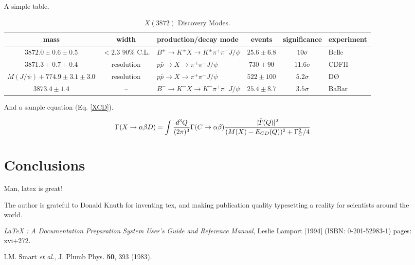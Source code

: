 \documentclass[aps,floatfix,prd,showpacs]{revtex4}
\begin{document}
A simple table.

\begin{table}[ht]
\caption{$X(3872)$ Discovery Modes.}
\label{XmodesTab}
\begin{tabular}{cclccl}
\hline
mass & width & production/decay mode & events & significance & experiment\\
\hline
\hline
$3872.0 \pm 0.6 \pm 0.5$  & $< 2.3$ 90\% C.L.  & $B^\pm \to K^\pm X \to K^\pm \pi^+ \pi^- J/\psi$   &  $25.6 \pm 6.8$ & $10 \sigma$     & Belle\\
$3871.3 \pm 0.7 \pm 0.4$  & resolution & $p\bar p \to  X \to \pi^+ \pi^- J/\psi$   &  $730 \pm 90$ & $11.6 \sigma$  & CDFII\\
$M(J/\psi) + 774.9 \pm 3.1 \pm 3.0$ & resolution & $p\bar p \to X \to \pi^+\pi^-J/\psi$ & $522 \pm 100$ & $5.2 \sigma$  & D{\O} \\
$3873.4 \pm 1.4$  &  --  & $B^- \to K^- X \to K^- \pi^+ \pi^- J/\psi$   &  $25.4 \pm 8.7$ &$3.5 \sigma$ & BaBar\\
\hline
\hline
\end{tabular}
\end{table}

And a sample equation (Eq. \ref{XCD}).

\begin{equation}
\Gamma(X \to \alpha\beta D) = \int {d^3Q\over (2\pi)^3}  \Gamma(C\to \alpha\beta) {|\tilde T(Q)|^2 \over
(M(X) - E_{CD}(Q))^2 + \Gamma_C^2/4}
\label{XCD}
\end{equation}





\section{Conclusions}

Man, latex is great!

\acknowledgments
The author is grateful to Donald Knuth for inventing tex, and making publication quality typesetting a reality for scientists around the world.


\begin{thebibliography}{99}

 {\sl LaTeX : A Documentation Preparation System User's Guide and Reference Manual}, Leslie Lamport [1994] (ISBN: 0-201-52983-1) pages: xvi+272.

I.M. Smart {\it et al.}, J. Plumb Phys. {\bf 50}, 393 (1983).

\end{thebibliography}
\end{document}
